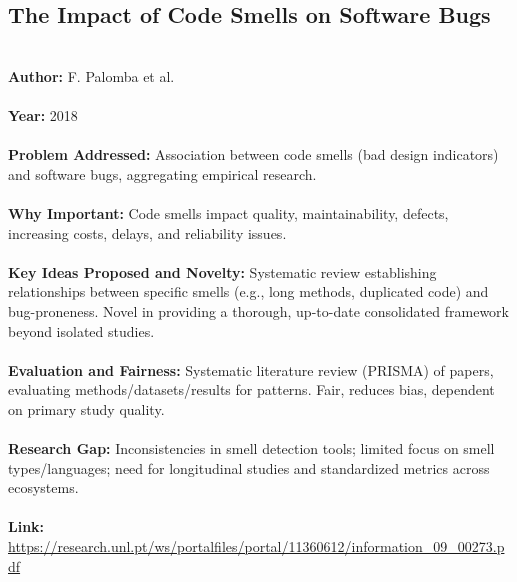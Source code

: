 \documentclass[12pt]{article}
\begin{document}
\subsection*{The Impact of Code Smells on Software Bugs}
\\
\textbf{Author:} F. Palomba et al. \\
\\
\textbf{Year:} 2018 \\
\\
\textbf{Problem Addressed:} Association between code smells (bad design indicators) and software bugs, aggregating empirical research. \\
\\
\textbf{Why Important:} Code smells impact quality, maintainability, defects, increasing costs, delays, and reliability issues. \\
\\
\textbf{Key Ideas Proposed and Novelty:} Systematic review establishing relationships between specific smells (e.g., long methods, duplicated code) and bug-proneness. Novel in providing a thorough, up-to-date consolidated framework beyond isolated studies. \\
\\
\textbf{Evaluation and Fairness:} Systematic literature review (PRISMA) of papers, evaluating methods/datasets/results for patterns. Fair, reduces bias, dependent on primary study quality. \\
\\
\textbf{Research Gap:} Inconsistencies in smell detection tools; limited focus on smell types/languages; need for longitudinal studies and standardized metrics across ecosystems. \\
\\
\textbf{Link:} \url{https://research.unl.pt/ws/portalfiles/portal/11360612/information_09_00273.pdf}
\pagebreak

\end{document}

